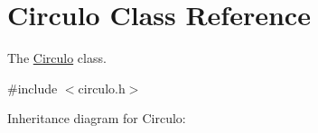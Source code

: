 \hypertarget{classCirculo}{}\section{Circulo Class Reference}
\label{classCirculo}


The \hyperlink{classCirculo}{Circulo} class.  




{\ttfamily \#include $<$circulo.\+h$>$}



Inheritance diagram for Circulo\+:
